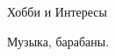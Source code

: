 \documentclass[
	11pt, %
]{resume} %
\begin{document}

\begin{rSection}{Хобби и Интересы}

	Музыка, барабаны.

\end{rSection}

\end{document}
